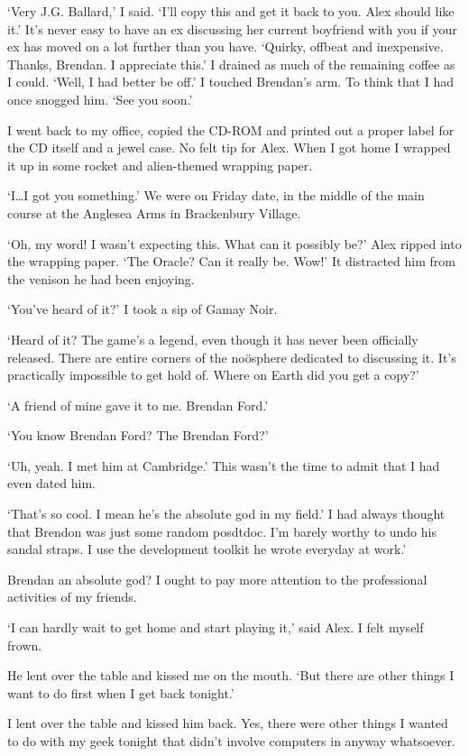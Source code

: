 `Very J.G. Ballard,' I said. `I'll copy this and get it back to you.
Alex should like it.' It's never easy to have an ex discussing her
current boyfriend with you if your ex has moved on a lot further
than you have. `Quirky, offbeat and inexpensive. Thanks, Brendan. I
appreciate this.' I drained as much of the remaining coffee as I
could. `Well, I had better be off.' I touched Brendan's arm. To think
that I had once snogged him. `See you soon.'

I went back to my office, copied the CD-ROM and printed out a proper
label for the CD itself and a jewel case. No felt tip for Alex. When
I got home I wrapped it up in some rocket and alien-themed wrapping
paper.

`I\dots I got you something.' We were on Friday date, in the middle of
the main course at the Anglesea Arms in Brackenbury Village.

`Oh, my word! I wasn't expecting this. What can it possibly be?'
Alex ripped into the wrapping paper. `The Oracle? Can it really be.
Wow!' It distracted him from the venison he had been enjoying.

`You've heard of it?' I took a sip of Gamay Noir.

`Heard of it? The game's a legend, even though it has never been
officially released. There are entire corners of the noösphere
dedicated to discussing it. It's practically impossible to get hold
of. Where on Earth did you get a copy?'

`A friend of mine gave it to me. Brendan Ford.'

`You know Brendan Ford? {\twelveit The\/} Brendan Ford?'

`Uh, yeah. I met him at Cambridge.' This wasn't the time to admit
that I had even dated him.

`That's so cool. I mean he's the absolute god in my field.' I had
always thought that Brendon was just some random posdtdoc. I'm
barely worthy to undo his sandal straps. I use the development
toolkit he wrote everyday at work.'

Brendan an absolute god? I ought to pay more attention to the
professional activities of my friends.

`I can hardly wait to get home and start playing it,' said Alex. I
felt myself frown.

He lent over the table and kissed me on the mouth. `But there are
other things I want to do first when I get back tonight.'

I lent over the table and kissed him back. Yes, there were other things I
wanted to do with my geek tonight that didn't involve computers in
anyway whatsoever.
\vfill\eject 
